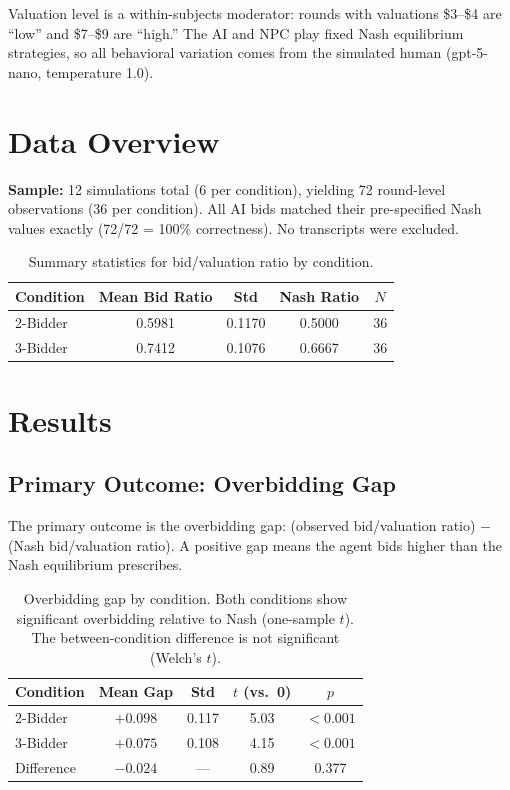 \documentclass[11pt]{article}
\begin{document}
\noindent Valuation level is a within-subjects moderator: rounds with valuations \$3--\$4 are ``low'' and \$7--\$9 are ``high.'' The AI and NPC play fixed Nash equilibrium strategies, so all behavioral variation comes from the simulated human (gpt-5-nano, temperature 1.0).

\section*{Data Overview}

\textbf{Sample:} 12 simulations total (6 per condition), yielding 72 round-level observations (36 per condition). All AI bids matched their pre-specified Nash values exactly (72/72 = 100\% correctness). No transcripts were excluded.

\begin{table}[h!]
\centering
\begin{tabular}{@{}lcccc@{}}
\toprule
Condition & Mean Bid Ratio & Std & Nash Ratio & $N$ \\
\midrule
2-Bidder & 0.5981 & 0.1170 & 0.5000 & 36 \\
3-Bidder & 0.7412 & 0.1076 & 0.6667 & 36 \\
\bottomrule
\end{tabular}
\caption{Summary statistics for bid/valuation ratio by condition.}
\end{table}

\section*{Results}

\subsection*{Primary Outcome: Overbidding Gap}

The primary outcome is the overbidding gap: (observed bid/valuation ratio) $-$ (Nash bid/valuation ratio). A positive gap means the agent bids higher than the Nash equilibrium prescribes.

\begin{table}[h!]
\centering
\begin{tabular}{@{}lcccc@{}}
\toprule
Condition & Mean Gap & Std & $t$ (vs.\ 0) & $p$ \\
\midrule
2-Bidder & $+0.098$ & 0.117 & 5.03 & $< 0.001$ \\
3-Bidder & $+0.075$ & 0.108 & 4.15 & $< 0.001$ \\
\midrule
Difference & $-0.024$ & --- & 0.89 & 0.377 \\
\bottomrule
\end{tabular}
\caption{Overbidding gap by condition. Both conditions show significant overbidding relative to Nash (one-sample $t$). The between-condition difference is not significant (Welch's $t$).}
\end{table}
\end{document}

